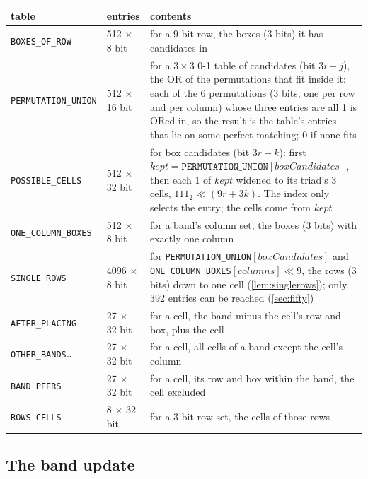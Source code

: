 \documentclass[11pt]{article}
\theoremstyle{definition}
\theoremstyle{plain}
\begin{document}
\begin{center}
\small
\begin{tabular}{ll>{\raggedright\arraybackslash}p{8.2cm}}
\toprule
table & entries & contents \\
\midrule
\texttt{BOXES\_OF\_ROW} & 512 $\times$ 8 bit & for a 9-bit row, the boxes (3 bits) it has candidates in \\
\texttt{PERMUTATION\_UNION} & 512 $\times$ 16 bit & for a $3\times 3$ 0-1 table of candidates (bit $3i+j$), the OR of the
  permutations that fit inside it: each of the 6 permutations (3 bits, one per row and per column) whose three entries
  are all 1 is ORed in, so the result is the table's entries that lie on some perfect matching; 0 if none fits \\
\texttt{POSSIBLE\_CELLS} & 512 $\times$ 32 bit & for box candidates (bit $3r+k$): first
  $\mathit{kept}=\texttt{PERMUTATION\_UNION}[\mathit{boxCandidates}]$, then each 1 of $\mathit{kept}$ widened to its triad's
  3 cells, $111_2 \ll (9r+3k)$. The index only selects the entry; the cells come from $\mathit{kept}$ \\
\texttt{ONE\_COLUMN\_BOXES} & 512 $\times$ 8 bit & for a band's column set, the boxes (3 bits) with exactly one column \\
\texttt{SINGLE\_ROWS} & 4096 $\times$ 8 bit & for \texttt{PERMUTATION\_UNION}$[\mathit{boxCandidates}]$ and
  \texttt{ONE\_COLUMN\_BOXES}$[\mathit{columns}]\ll 9$, the rows
  (3 bits) down to one cell (\cref{lem:singlerows}); only 392 entries can be reached (\cref{sec:fifty}) \\
\texttt{AFTER\_PLACING} & 27 $\times$ 32 bit & for a cell, the band minus the cell's row and box, plus the cell \\
\texttt{OTHER\_BANDS\ldots} & 27 $\times$ 32 bit & for a cell, all cells of a band except the cell's column \\
\texttt{BAND\_PEERS} & 27 $\times$ 32 bit & for a cell, its row and box within the band, the cell excluded \\
\texttt{ROWS\_CELLS} & 8 $\times$ 32 bit & for a 3-bit row set, the cells of those rows \\
\bottomrule
\end{tabular}
\end{center}

\subsection{The band update}
\end{document}
